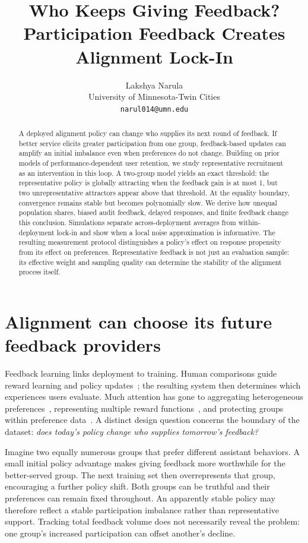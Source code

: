 \documentclass{article}
\title{Who Keeps Giving Feedback?\\Participation Feedback Creates Alignment Lock-In}
\author{Lakshya Narula\\University of Minnesota-Twin Cities\\\texttt{narul014@umn.edu}}
\begin{document}
\maketitle
\begin{abstract}
A deployed alignment policy can change who supplies its next round of feedback. If better service elicits greater participation from one group, feedback-based updates can amplify an initial imbalance even when preferences do not change. Building on prior models of performance-dependent user retention, we study representative recruitment as an intervention in this loop. A two-group model yields an exact threshold: the representative policy is globally attracting when the feedback gain is at most 1, but two unrepresentative attractors appear above that threshold. At the equality boundary, convergence remains stable but becomes polynomially slow. We derive how unequal population shares, biased audit feedback, delayed responses, and finite feedback change this conclusion. Simulations separate across-deployment averages from within-deployment lock-in and show when a local noise approximation is informative. The resulting measurement protocol distinguishes a policy's effect on response propensity from its effect on preferences. Representative feedback is not just an evaluation sample: its effective weight and sampling quality can determine the stability of the alignment process itself.
\end{abstract}

\section{Alignment can choose its future feedback providers}
Feedback learning links deployment to training. Human comparisons guide reward learning and policy updates~\citep{christiano2017,ouyang2022,bai2022,rafailov2023}; the resulting system then determines which experiences users evaluate. Much attention has gone to aggregating heterogeneous preferences~\citep{conitzer2024,ge2024}, representing multiple reward functions~\citep{chakraborty2024}, and protecting groups within preference data~\citep{ramesh2024,kim2026}. A distinct design question concerns the boundary of the dataset: \emph{does today's policy change who supplies tomorrow's feedback?}

Imagine two equally numerous groups that prefer different assistant behaviors. A small initial policy advantage makes giving feedback more worthwhile for the better-served group. The next training set then overrepresents that group, encouraging a further policy shift. Both groups can be truthful and their preferences can remain fixed throughout. An apparently stable policy may therefore reflect a stable participation imbalance rather than representative support. Tracking total feedback volume does not necessarily reveal the problem: one group's increased participation can offset another's decline.
\end{document}
